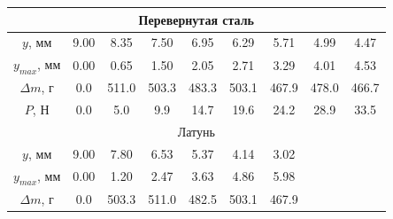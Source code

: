 \documentclass[12pt]{article}
\begin{document}
\begin{enumerate}
\begin{table}
\begin{tabular}{|ccccccccc|}
            \multicolumn{9}{|c|}{Перевернутая сталь}                                                                                                                                                                                                              \\ \hline
            \multicolumn{1}{|c|}{$y$, мм}       & \multicolumn{1}{c|}{9.00} & \multicolumn{1}{c|}{8.35}  & \multicolumn{1}{c|}{7.50}  & \multicolumn{1}{c|}{6.95}  & \multicolumn{1}{c|}{6.29}  & \multicolumn{1}{c|}{5.71}  & \multicolumn{1}{c|}{4.99}  & 4.47  \\ \hline
            \multicolumn{1}{|c|}{$y_{max}$, мм} & \multicolumn{1}{c|}{0.00} & \multicolumn{1}{c|}{0.65}  & \multicolumn{1}{c|}{1.50}  & \multicolumn{1}{c|}{2.05}  & \multicolumn{1}{c|}{2.71}  & \multicolumn{1}{c|}{3.29}  & \multicolumn{1}{c|}{4.01}  & 4.53  \\ \hline
            \multicolumn{1}{|c|}{$\Delta m$, г} & \multicolumn{1}{c|}{0.0}  & \multicolumn{1}{c|}{511.0} & \multicolumn{1}{c|}{503.3} & \multicolumn{1}{c|}{483.3} & \multicolumn{1}{c|}{503.1} & \multicolumn{1}{c|}{467.9} & \multicolumn{1}{c|}{478.0} & 466.7 \\ \hline
            \multicolumn{1}{|c|}{$P$, Н}        & \multicolumn{1}{c|}{0.0}  & \multicolumn{1}{c|}{5.0}   & \multicolumn{1}{c|}{9.9}   & \multicolumn{1}{c|}{14.7}  & \multicolumn{1}{c|}{19.6}  & \multicolumn{1}{c|}{24.2}  & \multicolumn{1}{c|}{28.9}  & 33.5  \\ \hline
            \multicolumn{9}{|c|}{Латунь}                                                                                                                                                                                                                          \\ \hline
            \multicolumn{1}{|c|}{$y$, мм}       & \multicolumn{1}{c|}{9.00} & \multicolumn{1}{c|}{7.80}  & \multicolumn{1}{c|}{6.53}  & \multicolumn{1}{c|}{5.37}  & \multicolumn{1}{c|}{4.14}  & \multicolumn{1}{c|}{3.02}  & \multicolumn{1}{c|}{}      &       \\ \hline
            \multicolumn{1}{|c|}{$y_{max}$, мм} & \multicolumn{1}{c|}{0.00} & \multicolumn{1}{c|}{1.20}  & \multicolumn{1}{c|}{2.47}  & \multicolumn{1}{c|}{3.63}  & \multicolumn{1}{c|}{4.86}  & \multicolumn{1}{c|}{5.98}  & \multicolumn{1}{c|}{}      &       \\ \hline
            \multicolumn{1}{|c|}{$\Delta m$, г} & \multicolumn{1}{c|}{0.0}  & \multicolumn{1}{c|}{503.3} & \multicolumn{1}{c|}{511.0} & \multicolumn{1}{c|}{482.5} & \multicolumn{1}{c|}{503.1} & \multicolumn{1}{c|}{467.9} & \multicolumn{1}{c|}{}      &       \\ \hline

\end{tabular}
\end{table}
\end{enumerate}
\end{document}
